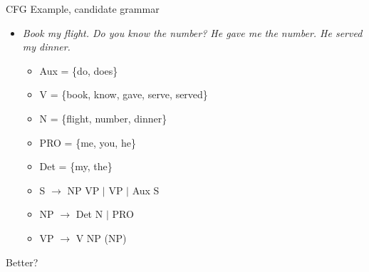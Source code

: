 \documentclass{beamer}
\begin{document}
\begin{frame}{CFG Example, candidate grammar}
  \begin{itemize}
  \item {\it Book my flight. Do you know the number? He gave me the number. He served my dinner.}
    \begin{itemize}
    \item Aux = \{do, does\}
    \item V = \{book, know, gave, serve, served\}
    \item N = \{flight, number, dinner\} 
    \item PRO = \{me, you, he\}
    \item Det = \{my, the\}
    \item S $\rightarrow$ NP VP $\vert$ VP $\vert$ Aux S
    \item NP $\rightarrow$ Det N $\vert$ PRO
    \item VP $\rightarrow$ V NP (NP)
    \end{itemize}
  \end{itemize}
  
  Better?
\end{frame}

%
%
\end{document}
